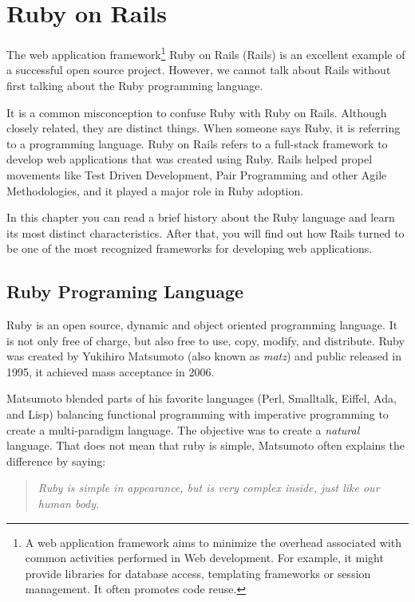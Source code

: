 \thispagestyle{empty}
\chapter{Ruby on Rails}\label{chap:ruby_on_rails}

The \textsf{web application framework}\footnote{
  A web application framework aims to minimize the overhead associated with common activities performed in Web development. 
  For example, it might provide libraries for database access, templating frameworks or session management. 
  It often promotes code reuse.
} Ruby on Rails (Rails) is an excellent example of a successful open source project.
However, we cannot talk about Rails without first talking about the Ruby programming language.

It is a common misconception to confuse Ruby with Ruby on Rails. 
Although closely related, they are distinct things.
When someone says Ruby, it is referring to a programming language.
Ruby on Rails refers to a full-stack framework to develop web applications that was created using Ruby.
Rails helped propel movements like 
Test Driven Development, Pair Programming and other Agile Methodologies, 
and it played a major role in Ruby adoption. 

In this chapter you can read a brief history about the Ruby language
and learn its most distinct characteristics.
After that, you will find out how Rails turned to be one of the 
most recognized frameworks for developing web applications. 



\section{Ruby Programing Language} 
Ruby is an open source, dynamic and object oriented programming language.
It is not only free of charge, but also free to use, copy, modify, and distribute.
Ruby was created by Yukihiro Matsumoto (also known as \emph{matz}) and public released in 1995, 
it achieved mass acceptance in 2006.

Matsumoto blended parts of his favorite languages (Perl, Smalltalk, Eiffel, Ada, and Lisp) 
balancing functional programming with imperative programming 
to create a multi-paradigm language. 
The objective was to create a \emph{natural} language. 
That does not mean that ruby is simple, Matsumoto often explains the difference by saying:

\begin{quote}\emph{
  Ruby is simple in appearance, but is very complex inside, just like our human body.
}\end{quote}

